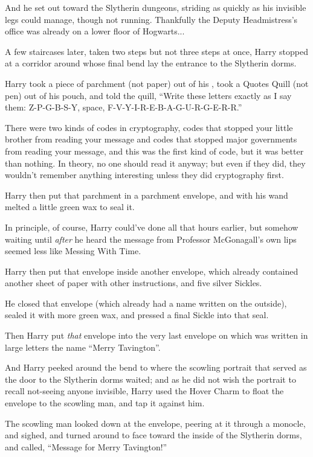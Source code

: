 And he set out toward the Slytherin dungeons, striding as quickly as his invisible legs could manage, though not running. Thankfully the Deputy Headmistress’s office was already on a lower floor of Hogwarts...

A few staircases later, taken two steps but not three steps at once, Harry stopped at a corridor around whose final bend lay the entrance to the Slytherin dorms.

Harry took a piece of parchment (not paper) out of his , took a Quotes Quill (not pen) out of his pouch, and told the quill, “Write these letters exactly as I say them: Z-P-G-B-S-Y, space, F-V-Y-I-R-E-B-A-G-U-R-G-E-R-R.”

There were two kinds of codes in cryptography, codes that stopped your little brother from reading your message and codes that stopped major governments from reading your message, and this was the first kind of code, but it was better than nothing. In theory, no one should read it anyway; but even if they did, they wouldn’t remember anything interesting unless they did cryptography first.

Harry then put that parchment in a parchment envelope, and with his wand melted a little green wax to seal it.

In principle, of course, Harry could’ve done all that hours earlier, but somehow waiting until \emph{after} he heard the message from Professor McGonagall’s own lips seemed less like Messing With Time.

Harry then put that envelope inside another envelope, which already contained another sheet of paper with other instructions, and five silver Sickles.

He closed that envelope (which already had a name written on the outside), sealed it with more green wax, and pressed a final Sickle into that seal.

Then Harry put \emph{that} envelope into the very last envelope on which was written in large letters the name “Merry Tavington”.

And Harry peeked around the bend to where the scowling portrait that served as the door to the Slytherin dorms waited; and as he did not wish the portrait to recall not-seeing anyone invisible, Harry used the Hover Charm to float the envelope to the scowling man, and tap it against him.

The scowling man looked down at the envelope, peering at it through a monocle, and sighed, and turned around to face toward the inside of the Slytherin dorms, and called, “Message for Merry Tavington!”

